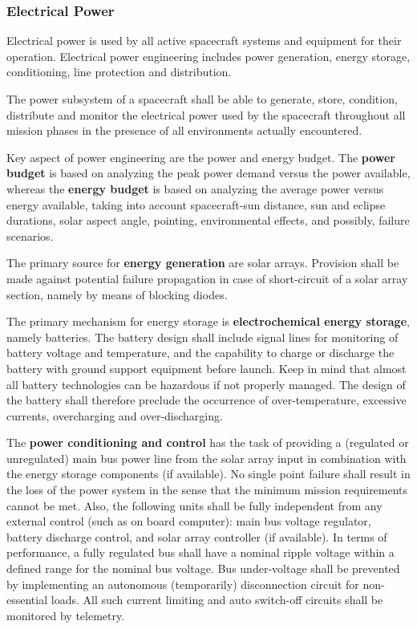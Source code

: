 \subsubsection{Electrical Power}

Electrical power is used by all active spacecraft systems and equipment for their operation. Electrical power engineering includes power generation, energy storage,  conditioning, line protection and distribution. 

The power subsystem of a spacecraft shall be able to generate, store, condition, distribute and monitor the electrical power used by the spacecraft throughout all mission phases in the presence of all environments actually encountered.

Key aspect of power engineering are the power and energy budget. The \textbf{power budget} is based on analyzing the peak power demand versus the power available, whereas the \textbf{energy budget} is based on analyzing the average power versus energy available, taking into account spacecraft-sun distance, sun and eclipse durations, solar aspect angle, pointing, environmental effects, and possibly, failure scenarios.

The primary source for \textbf{energy generation} are solar arrays. Provision shall be made against potential failure propagation in case of short-circuit of a solar array section, namely by means of blocking diodes.

The primary mechanism for energy storage is \textbf{electrochemical energy storage}, namely batteries. The battery design shall include signal lines for monitoring of battery voltage and temperature, and the capability to charge or discharge the battery with ground support equipment before launch. Keep in mind that almost all battery technologies can be hazardous if not properly managed. The design of the battery shall therefore preclude the occurrence of over-temperature, excessive currents, overcharging and over-discharging.

The \textbf{power conditioning and control} has the task of providing a (regulated or unregulated) main bus power line from the solar array input in combination with the energy storage components (if available). No single point failure shall result in the loss of the power system in the sense that the minimum mission requirements cannot be met. Also, the following units shall be fully independent from any external control (such as on board computer): main bus voltage regulator, battery discharge control, and solar array controller (if available). In terms of performance, a fully regulated bus shall have a nominal ripple voltage within a defined range for the nominal bus voltage. Bus under-voltage shall be prevented by implementing an autonomous (temporarily) disconnection circuit for non-essential loads. All such current limiting and auto switch-off circuits shall be monitored by telemetry.

